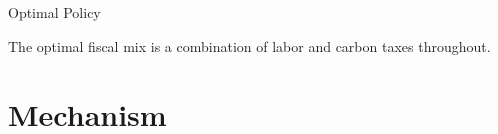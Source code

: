 \documentclass[11pt,aspectratio=169]{beamer}
\begin{document}
\begin{frame}{Optimal Policy}
\begin{figure}[h!!]
\begin{subfigure}{0.4\textwidth}
\end{subfigure}
	\end{figure}
\vspace{3mm}
\begin{block}{}
The optimal fiscal mix is a combination of labor and carbon taxes throughout. 
\end{block}	
\end{frame}

\hypertarget{benf}{}
\section*{Mechanism}
\end{document}
